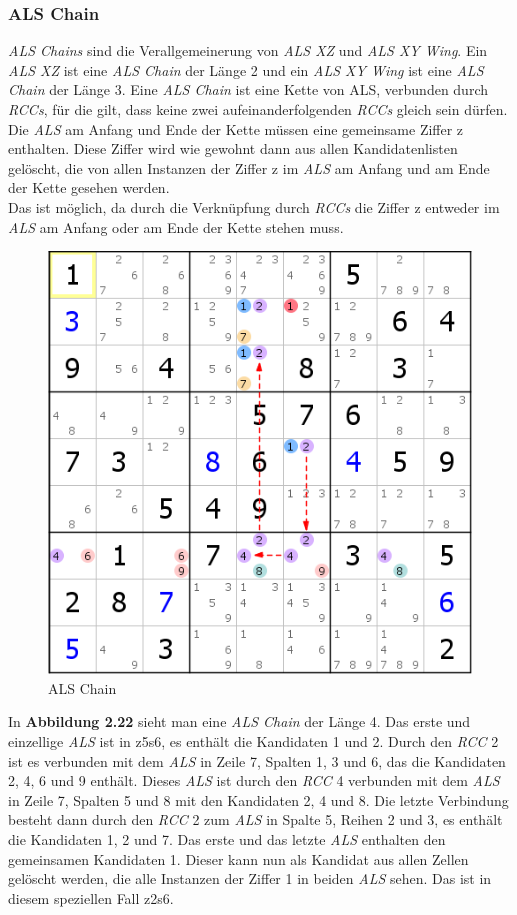 \newpage
\subsubsection{ALS Chain}
\textit{ALS Chains} sind die Verallgemeinerung von \textit{ALS XZ} und \textit{ALS XY Wing}. Ein \textit{ALS XZ} ist eine \textit{ALS Chain} der Länge 2 und ein \textit{ALS XY Wing} ist eine \textit{ALS Chain} der Länge 3. Eine \textit{ALS Chain} ist eine Kette von {ALS}, verbunden durch \textit{RCCs}, für die gilt, dass keine zwei aufeinanderfolgenden \textit{RCCs} gleich sein dürfen. Die \textit{ALS} am Anfang und Ende der Kette müssen eine gemeinsame Ziffer z enthalten. Diese Ziffer wird wie gewohnt dann aus allen Kandidatenlisten gelöscht, die von allen Instanzen der Ziffer z im \textit{ALS} am Anfang und am Ende der Kette gesehen werden.\\
Das ist möglich, da durch die Verknüpfung durch \textit{RCCs} die Ziffer z entweder im \textit{ALS} am Anfang oder am Ende der Kette stehen muss.

\begin{figure}[h]
\begin{center}
\includegraphics{./img/ALS_Chain.png}
\caption{ALS Chain}
\end{center}
\end{figure}

\noindent In \textbf{Abbildung 2.22} sieht man eine \textit{ALS Chain} der Länge 4. Das erste und einzellige \textit{ALS} ist in z5s6, es enthält die Kandidaten 1 und 2. Durch den \textit{RCC} 2 ist es verbunden mit dem \textit{ALS} in Zeile 7, Spalten 1, 3 und 6, das die Kandidaten 2, 4, 6 und 9 enthält. Dieses \textit{ALS} ist durch den \textit{RCC} 4 verbunden mit dem \textit{ALS} in Zeile 7, Spalten 5 und 8 mit den Kandidaten 2, 4 und 8. Die letzte Verbindung besteht dann durch den \textit{RCC} 2 zum \textit{ALS} in Spalte 5, Reihen 2 und 3, es enthält die Kandidaten 1, 2 und 7. Das erste und das letzte \textit{ALS} enthalten den gemeinsamen Kandidaten 1. Dieser kann nun als Kandidat aus allen Zellen gelöscht werden, die alle Instanzen der Ziffer 1 in beiden \textit{ALS} sehen. Das ist in diesem speziellen Fall z2s6.